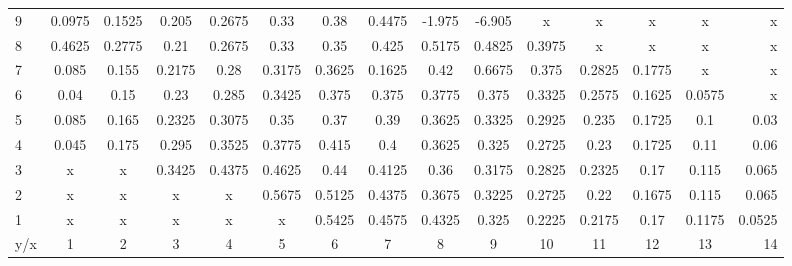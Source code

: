 \begin{tabular}{| l || c | c | c | c | c | c | c | c | c | c | c | c | c | r |}
\hline
9   &0.0975	&0.1525	&0.205	&0.2675	&0.33	&0.38	&0.4475	&-1.975	&-6.905	&x	    &x	    &x	    &x	    &x\\
8   &0.4625	&0.2775	&0.21	&0.2675	&0.33	&0.35	&0.425	&0.5175	&0.4825	&0.3975	&x	    &x	    &x	    &x\\
7   &0.085	&0.155	&0.2175	&0.28	&0.3175	&0.3625	&0.1625	&0.42	&0.6675	&0.375	&0.2825	&0.1775	&x	    &x\\
6   &0.04	&0.15	&0.23	&0.285	&0.3425	&0.375	&0.375	&0.3775	&0.375	&0.3325	&0.2575	&0.1625	&0.0575	&x\\
5   &0.085	&0.165	&0.2325	&0.3075	&0.35	&0.37	&0.39	&0.3625	&0.3325	&0.2925	&0.235	&0.1725	&0.1	&0.03\\
4   &0.045	&0.175	&0.295	&0.3525	&0.3775	&0.415	&0.4	&0.3625	&0.325	&0.2725	&0.23	&0.1725	&0.11	&0.06\\
3   &x	    &x	    &0.3425	&0.4375	&0.4625	&0.44	&0.4125	&0.36	&0.3175	&0.2825	&0.2325	&0.17	&0.115	&0.065\\
2   &x	    &x	    &x	    &x	    &0.5675	&0.5125	&0.4375	&0.3675	&0.3225	&0.2725	&0.22	&0.1675	&0.115	&0.065\\
1   &x	    &x	    &x	    &x	    &x	    &0.5425	&0.4575	&0.4325	&0.325	&0.2225	&0.2175	&0.17	&0.1175	&0.0525\\ \hline \hline
y/x &1	    &2	    &3	    &4	    &5	    &6	    &7	    &8	    &9	    &10	    &11	    &12	    &13	    &14\\ \hline
\end{tabular}